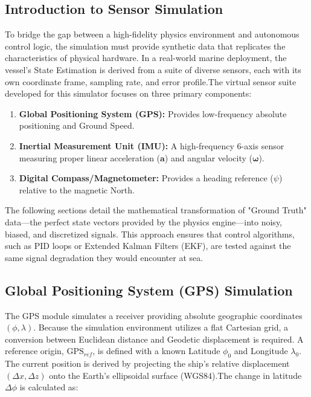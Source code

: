 \subsection{Introduction to Sensor Simulation}

To bridge the gap between a high-fidelity physics environment and autonomous control logic, the simulation must provide synthetic data that replicates the characteristics of physical hardware. In a real-world marine deployment, the vessel’s State Estimation is derived from a suite of diverse sensors, each with its own coordinate frame, sampling rate, and error profile.The virtual sensor suite developed for this simulator focuses on three primary components:

\begin{enumerate}
    
    \item \textbf{Global Positioning System (GPS):} Provides low-frequency absolute positioning and Ground Speed.
    
    \item \textbf{Inertial Measurement Unit (IMU):} A high-frequency 6-axis sensor measuring proper linear acceleration ($\mathbf{a}$) and angular velocity ($\mathbf{\omega}$).
    
    \item \textbf{Digital Compass/Magnetometer:} Provides a heading reference ($\psi$) relative to the magnetic North.

\end{enumerate}

The following sections detail the mathematical transformation of "Ground Truth" data—the perfect state vectors provided by the physics engine—into noisy, biased, and discretized signals. This approach ensures that control algorithms, such as PID loops or Extended Kalman Filters (EKF), are tested against the same signal degradation they would encounter at sea.





\subsection{Global Positioning System (GPS) Simulation}

The GPS module simulates a receiver providing absolute geographic coordinates $(\phi, \lambda)$. Because the simulation environment utilizes a flat Cartesian grid, a conversion between Euclidean distance and Geodetic displacement is required. A reference origin, $\text{GPS}_{ref}$, is defined with a known Latitude $\phi_0$ and Longitude $\lambda_0$. The current position is derived by projecting the ship's relative displacement $(\Delta x, \Delta z)$ onto the Earth's ellipsoidal surface (WGS84).The change in latitude $\Delta \phi$ is calculated as:

